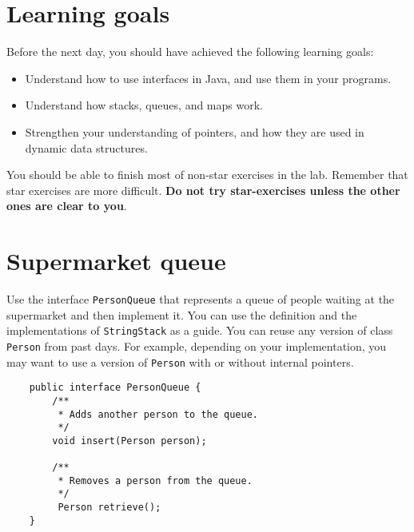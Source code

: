 \documentclass{article}
\begin{document}
\section*{Learning goals}
\label{sec:learning-goals}

Before the next day, you should have achieved the following learning
goals: 

\begin{itemize}
\item Understand how to use interfaces in Java, and use them in your
  programs. 
\item Understand how stacks, queues, and maps work. 
\item Strengthen your understanding of pointers, and how they are used
  in dynamic data structures. 
\end{itemize}

You should be able to finish most of non-star exercises in the lab. 
Remember that star exercises are more difficult. 
\textbf{Do not try star-exercises unless the other ones are clear to
  you}.  





\section{Supermarket queue}
\label{sec:queues}

Use the interface \verb+PersonQueue+ that represents a queue of
people waiting at the supermarket and then implement it. You can use
the definition and the implementations of \verb+StringStack+ as a
guide. You can reuse any version of class \verb+Person+ from past
days. For example, depending on your implementation, you may want to
use a version of \verb+Person+ with or without internal pointers. 

\begin{verbatim}
    public interface PersonQueue {
        /**
         * Adds another person to the queue.
         */
        void insert(Person person);

        /**
         * Removes a person from the queue.
         */ 
         Person retrieve();
    }
\end{verbatim}
\end{document}
